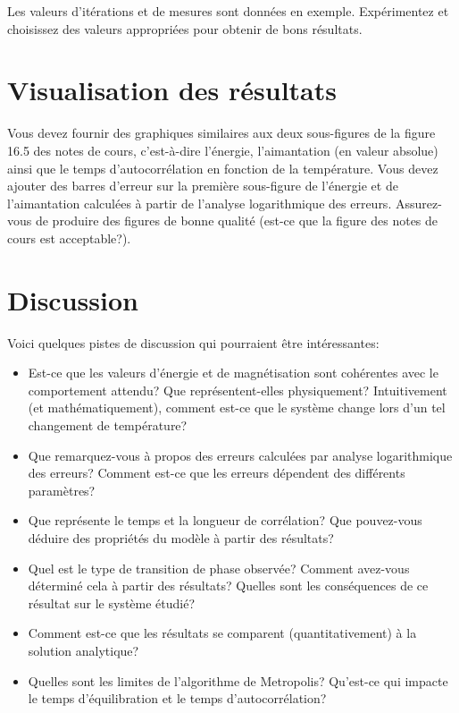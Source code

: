 \documentclass[12pt, letterpaper]{article}
\begin{document}
\begin{tcolorbox}[]
	Les valeurs d'itérations et de mesures sont données en exemple. Expérimentez et choisissez des valeurs appropriées pour obtenir de bons résultats.
\end{tcolorbox}

\section{Visualisation des résultats}\label{sec:visualisation-des-resultats}

\noindent Vous devez fournir des graphiques similaires aux deux sous-figures de la figure 16.5 des notes de cours, c'est-à-dire l'énergie, l'aimantation (en valeur absolue) ainsi que le temps d'autocorrélation en fonction de la température.
Vous devez ajouter des barres d'erreur sur la première sous-figure de l'énergie et de l'aimantation calculées à partir de l'analyse logarithmique des erreurs.
Assurez-vous de produire des figures de bonne qualité (est-ce que la figure des notes de cours est acceptable?).

\section{Discussion}\label{sec:verification}

Voici quelques pistes de discussion qui pourraient être intéressantes:

\begin{itemize}
	\item Est-ce que les valeurs d'énergie et de magnétisation sont cohérentes avec le comportement attendu? Que représentent-elles physiquement? Intuitivement (et mathématiquement), comment est-ce que le système change lors d'un tel changement de température?
	\item Que remarquez-vous à propos des erreurs calculées par analyse logarithmique des erreurs? Comment est-ce que les erreurs dépendent des différents paramètres?
	\item Que représente le temps et la longueur de corrélation? Que pouvez-vous déduire des propriétés du modèle à partir des résultats?
	\item Quel est le type de transition de phase observée? Comment avez-vous déterminé cela à partir des résultats? Quelles sont les conséquences de ce résultat sur le système étudié?
	\item Comment est-ce que les résultats se comparent (quantitativement) à la solution analytique?
	\item Quelles sont les limites de l'algorithme de Metropolis? Qu'est-ce qui impacte le temps d'équilibration et le temps d'autocorrélation?
\end{itemize}
\end{document}
